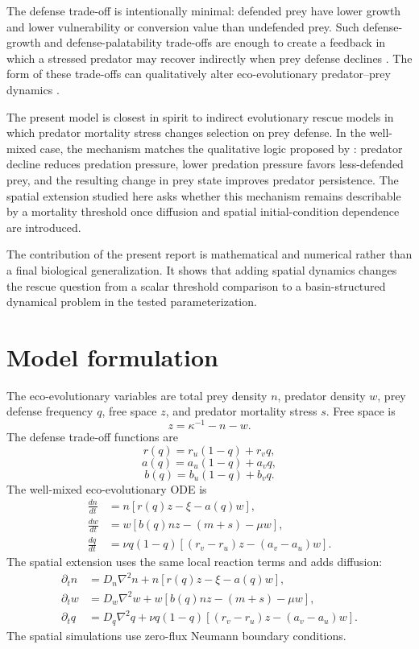 \documentclass[11pt]{article}
\begin{document}
The defense trade-off is intentionally minimal: defended prey have lower growth and lower vulnerability or conversion value than undefended prey. Such defense-growth and defense-palatability trade-offs are enough to create a feedback in which a stressed predator may recover indirectly when prey defense declines \citep{YamamichiMiner2015}. The form of these trade-offs can qualitatively alter eco-evolutionary predator--prey dynamics \citep{KasadaYamamichiYoshida2014}.

The present model is closest in spirit to indirect evolutionary rescue models in which predator mortality stress changes selection on prey defense. In the well-mixed case, the mechanism matches the qualitative logic proposed by \citet{YamamichiMiner2015}: predator decline reduces predation pressure, lower predation pressure favors less-defended prey, and the resulting change in prey state improves predator persistence. The spatial extension studied here asks whether this mechanism remains describable by a mortality threshold once diffusion and spatial initial-condition dependence are introduced.

The contribution of the present report is mathematical and numerical rather than a final biological generalization. It shows that adding spatial dynamics changes the rescue question from a scalar threshold comparison to a basin-structured dynamical problem in the tested parameterization.

\section{Model formulation}

The eco-evolutionary variables are total prey density \(n\), predator density \(w\), prey defense frequency \(q\), free space \(z\), and predator mortality stress \(s\). Free space is
\[
z = \kappa^{-1} - n - w.
\]
The defense trade-off functions are
\[
r(q)=r_u(1-q)+r_v q,
\]
\[
a(q)=a_u(1-q)+a_v q,
\]
\[
b(q)=b_u(1-q)+b_v q.
\]
The well-mixed eco-evolutionary ODE is
\begin{align}
\frac{dn}{dt} &= n[r(q)z-\xi-a(q)w],\\
\frac{dw}{dt} &= w[b(q)nz-(m+s)-\mu w],\\
\frac{dq}{dt} &= \nu q(1-q)[(r_v-r_u)z-(a_v-a_u)w].
\end{align}
The spatial extension uses the same local reaction terms and adds diffusion:
\begin{align}
\partial_t n &= D_n\nabla^2 n + n[r(q)z-\xi-a(q)w],\\
\partial_t w &= D_w\nabla^2 w + w[b(q)nz-(m+s)-\mu w],\\
\partial_t q &= D_q\nabla^2 q + \nu q(1-q)[(r_v-r_u)z-(a_v-a_u)w].
\end{align}
The spatial simulations use zero-flux Neumann boundary conditions.
\end{document}
